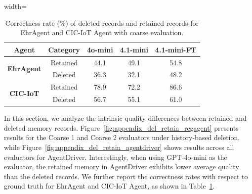 \documentclass[11pt]{article}
\theoremstyle{plain}
\theoremstyle{definition}
\begin{document}
{\begin{table}[h!]
\centering
\caption{Correctness rate (\%) of deleted records and retained records for EhrAgent and CIC-IoT Agent with coarse evaluation.}
\begin{adjustbox}{width=\linewidth} %
\begin{tabular}{c|c|c|c|c}
\toprule
\textbf{Agent} & \textbf{Category} & \textbf{4o-mini} & \textbf{4.1-mini} & \textbf{4.1-mini-FT} \\
\midrule
\multirow{2}{*}{\textbf{EhrAgent}}&Retained & 44.1 & 49.1 & 54.8  \\
&Deleted & 36.3 & 32.1 & 48.2  \\ \midrule
\multirow{2}{*}{\textbf{CIC-IoT}}&Retained & 78.9 & 72.2 & 86.6  \\
&Deleted & 56.7 & 55.1 & 61.0 \\
\bottomrule
\end{tabular}
\end{adjustbox}
\label{tab:appendix_del_retain_ehr}
\end{table}
In this section, we analyze the intrinsic quality differences between retained and deleted memory records.
Figure~\ref{fig:appendix_del_retain_regagent} presents results for the Coarse 1 and Coarse 2 evaluators under history-based deletion, while Figure~\ref{fig:appendix_del_retain_agentdriver} shows results across all evaluators for {AgentDriver}.
Interestingly, when using GPT-4o-mini as the evaluator, the retained memory in {AgentDriver} exhibits lower average quality than the deleted records.
We further report the correctness rates with respect to ground truth for {EhrAgent} and {CIC-IoT Agent}, as shown in Table~\ref{tab:appendix_del_retain_ehr}.


}
\end{document}
